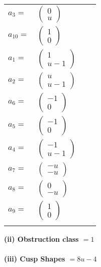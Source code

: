 \documentclass[1p]{elsarticle_modified}
\theoremstyle{definition}
\begin{document}
\begin{tabular}{m{7pt} m{180pt} m{7pt} m{180pt} }
\flushright $a_{3}=$&$\begin{pmatrix}0\\u\end{pmatrix}$ \\
\flushright $a_{10}=$&$\begin{pmatrix}1\\0\end{pmatrix}$ \\
\flushright $a_{1}=$&$\begin{pmatrix}1\\u-1\end{pmatrix}$ \\
\flushright $a_{2}=$&$\begin{pmatrix}u\\u-1\end{pmatrix}$ \\
\flushright $a_{6}=$&$\begin{pmatrix}-1\\0\end{pmatrix}$ \\
\flushright $a_{5}=$&$\begin{pmatrix}-1\\0\end{pmatrix}$ \\
\flushright $a_{4}=$&$\begin{pmatrix}-1\\u-1\end{pmatrix}$ \\
\flushright $a_{7}=$&$\begin{pmatrix}- u\\- u\end{pmatrix}$ \\
\flushright $a_{8}=$&$\begin{pmatrix}0\\- u\end{pmatrix}$ \\
\flushright $a_{9}=$&$\begin{pmatrix}1\\0\end{pmatrix}$\\&\end{tabular}
\flushleft \textbf{(ii) Obstruction class $= 1$}\\~\\
\flushleft \textbf{(iii) Cusp Shapes $= 8 u-4$}\\~\\
\end{document}
